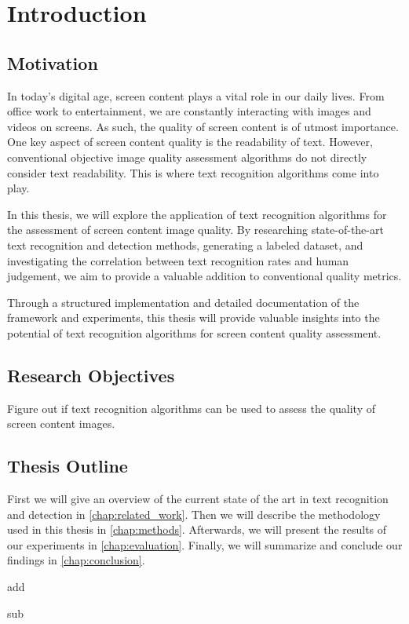 \chapter{Introduction}
\label{chap:Introduction}

\section{Motivation}

In today’s digital age, screen content plays a vital role in our daily lives.
From office work to entertainment, we are constantly interacting with images and videos on screens.
As such, the quality of screen content is of utmost importance.
One key aspect of screen content quality is the readability of text.
However, conventional objective image quality assessment algorithms do not directly consider text readability.
This is where text recognition algorithms come into play.

In this thesis, we will explore the application of text recognition algorithms for the assessment of screen content image quality.
By researching state-of-the-art text recognition and detection methods, generating a labeled dataset, and investigating the correlation between text recognition rates and human judgement, we aim to provide a valuable addition to conventional quality metrics.

Through a structured implementation and detailed documentation of the framework and experiments, this thesis will provide valuable insights into the potential of text recognition algorithms for screen content quality assessment.

\section{Research Objectives}

Figure out if text recognition algorithms can be used to assess the quality of screen content images.

\section{Thesis Outline}

First we will give an overview of the current state of the art in text recognition and detection in \autoref{chap:related_work}.
Then we will describe the methodology used in this thesis in \autoref{chap:methods}.
Afterwards, we will present the results of our experiments in \autoref{chap:evaluation}.
Finally, we will summarize and conclude our findings in \autoref{chap:conclusion}.

\gls{add}

\gls{sub}

